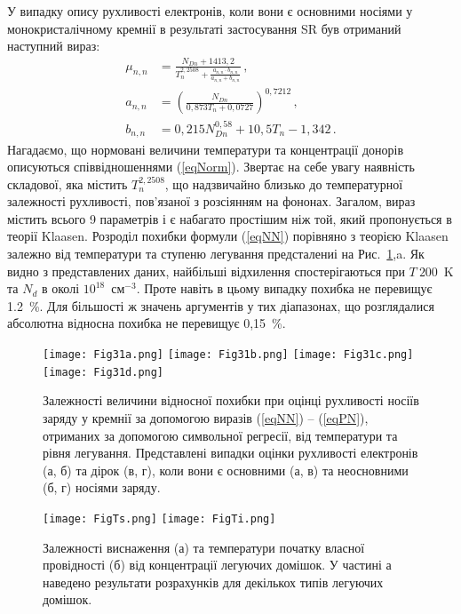 \documentclass[14pt,a4paper,titlepage,oneside]{book}
\numberwithin{equation}{part}
\begin{document}
У випадку опису рухливості електронів, коли вони є основними носіями у монокристалічному кремнії в результаті застосування SR був отриманий
наступний вираз:
\begin{subequations} \label{eqNN}
    \begin{align}
      \mu_{n,n}& =\frac{N_{Dn}+1413,2}{T_n^{2,2508}+\frac{a_{n,n}\cdot b_{n,n}}{a_{n,n}+b_{n,n}}}\,, \label{eqNNa} \\
      a_{n,n} &=\left(\frac{N_{Dn}}{0,873T_n+0,0727}\right)^{0,7212}\,, \label{eqNNb} \\
      b_{n,n}& =0,215N_{Dn}^{0,58}+10,5T_n-1,342\,. \label{eqNNc}
    \end{align}
\end{subequations}
Нагадаємо, що нормовані величини температури та концентрації донорів описуються співвідношеннями (\ref{eqNorm}).
Звертає на себе увагу наявність складової, яка містить $T_n^{2,2508}$, що надзвичайно близько до
температурної залежності рухливості, пов'язаної з розсіянням на фононах.
Загалом, вираз містить всього 9 параметрів і є набагато простішим ніж той, який пропонується в теорії Klaasen.
Розроділ похибки формули (\ref{eqNN}) порівняно з теорією  Klaasen залежно від температури та ступеню легування предсталениі на Рис.~\ref{figSR},a.
Як видно з представлених даних, найбільші відхилення спостерігаються при $T~200$~K та $N_d$ в околі $10^{18}$~см$^{-3}$.
Проте навіть в цьому випадку похибка не перевищує 1.2~\%.
Для більшості ж значень аргументів у тих діапазонах, що розглядалися абсолютна відносна похибка не перевищує 0,15~\%.

\begin{figure}
	\centering
     \texttt{[image: Fig31a.png]}
     \texttt{[image: Fig31b.png]}
     \texttt{[image: Fig31c.png]}
     \texttt{[image: Fig31d.png]}
	  \caption{Залежності величини відносної похибки при оцінці рухливості носіїв заряду
у кремнії за допомогою виразів (\ref{eqNN}) -- (\ref{eqPN}),
отриманих за допомогою символьної регресії, від температури та рівня легування.
Представлені випадки оцінки рухливості електронів (а, б) та дірок (в, г), коли вони є
основними (а, в) та неосновними (б, г) носіями заряду.
}\label{figSR}
\end{figure}

\begin{figure}
	\centering
     \texttt{[image: FigTs.png]}
     \texttt{[image: FigTi.png]}
	  \caption{Залежності виснаження (а) та температури початку власної провідності (б)
від концентрації легуючих домішок. У частині а наведено результати розрахунків для декількох типів легуючих домішок.
}\label{figTsTi}
\end{figure}
\end{document}
